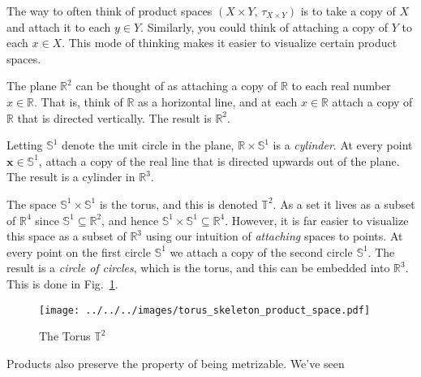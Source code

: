 \documentclass{article}
\theoremstyle{plain}
\theoremstyle{normal}
\newenvironment{example}{%
    \pushQED{\qed}\renewcommand{\qedsymbol}{$\blacksquare$}\examplex%
}{%
    \popQED\endexamplex%
}
\begin{document}
        The way to often think of product spaces
        $(X\times{Y},\,\tau_{X\times{Y}})$ is to take a copy of
        $X$ and attach it to each $y\in{Y}$. Similarly, you could think of
        attaching a copy of $Y$ to each $x\in{X}$. This mode of thinking makes
        it easier to visualize certain product spaces.
        \begin{example}
            The plane $\mathbb{R}^{2}$ can be thought of as attaching a
            copy of $\mathbb{R}$ to each real number $x\in\mathbb{R}$.
            That is, think of $\mathbb{R}$ as a horizontal line, and at
            each $x\in\mathbb{R}$ attach a copy of $\mathbb{R}$ that is
            directed vertically. The result is
            $\mathbb{R}^{2}$.
        \end{example}
        \begin{example}
            Letting $\mathbb{S}^{1}$ denote the unit circle in the plane,
            $\mathbb{R}\times\mathbb{S}^{1}$ is a \textit{cylinder}. At every
            point $\mathbf{x}\in\mathbb{S}^{1}$, attach a copy of the real
            line that is directed upwards out of the plane. The result is a
            cylinder in $\mathbb{R}^{3}$.
        \end{example}
        \begin{example}
            The space $\mathbb{S}^{1}\times\mathbb{S}^{1}$ is the torus, and
            this is denoted $\mathbb{T}^{2}$. As a set it lives as a subset of
            $\mathbb{R}^{4}$ since $\mathbb{S}^{1}\subseteq\mathbb{R}^{2}$,
            and hence $\mathbb{S}^{1}\times\mathbb{S}^{1}\subseteq\mathbb{R}^{4}$.
            However, it is far easier to visualize this space as a subset of
            $\mathbb{R}^{3}$ using our intuition of \textit{attaching} spaces
            to points. At every point on the first circle $\mathbb{S}^{1}$
            we attach a copy of the second circle $\mathbb{S}^{1}$. The result
            is a \textit{circle of circles}, which is the torus, and this can
            be embedded into $\mathbb{R}^{3}$. This is done in
            Fig.~\ref{fig:torus_skeleton_product_space}.
        \end{example}
        \begin{figure}
            \centering
            \texttt{[image: ../../../images/torus\_skeleton\_product\_space.pdf]}
            \caption{The Torus $\mathbb{T}^{2}$}
            \label{fig:torus_skeleton_product_space}
        \end{figure}
        Products also preserve the property of being metrizable. We've seen
\end{document}
